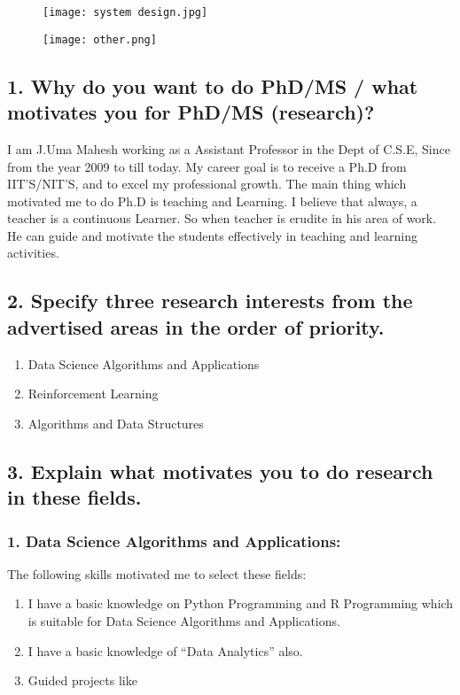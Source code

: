 \documentclass{article}
\begin{document}
\begin{figure}
 \texttt{[image: system design.jpg]}
\end{figure}
\clearpage

\begin{figure}
 \texttt{[image: other.png]}
\end{figure}
\clearpage

\subsection*{\textbf{1. Why do you want to do PhD/MS / what motivates you for PhD/MS (research)?}}
\hspace{1cm}
I am J.Uma Mahesh working as a Assistant Professor in the Dept of C.S.E, Since from the year 2009 to
till today. My career goal is to receive a Ph.D from IIT’S/NIT’S, and to excel my professional growth.
The main thing which motivated me to do Ph.D is teaching and Learning. I believe that always, a teacher
is a continuous Learner. So when teacher is erudite in his area of work. He can guide and motivate the
students effectively in teaching and learning activities.

\subsection*{\textbf{2. Specify three research interests from the advertised areas in the order of priority.}}
\begin{enumerate}
 \item Data Science Algorithms and Applications
 \item Reinforcement Learning
 \item Algorithms and Data Structures

\end{enumerate}

\subsection*{\textbf{3. Explain what motivates you to do research in these fields.}}
\subsubsection*{1. Data Science Algorithms and Applications:}

The following skills motivated me to select these fields:
\begin{enumerate}
 \item I have a basic knowledge on Python Programming and R Programming which is suitable for Data
Science Algorithms and Applications.
\item I have a basic knowledge of “Data Analytics” also.
\item Guided projects like
\end{enumerate}
\end{document}
